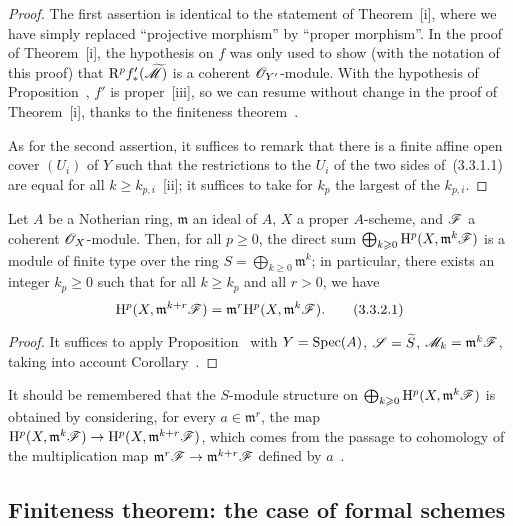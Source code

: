\begin{proof}
\label{proof-3.3.3.1}
The first assertion is identical to the statement of Theorem~[i], where we have simply replaced ``projective morphism'' by ``proper morphism''.
In the proof of Theorem~[i], the hypothesis on $f$ was only used to show (with the notation of this proof) that $\mathrm{R}^p f_*'(\widetilde{\mathscr{M}})$ is a coherent $\mathscr{O}_{Y'}$-module.
With the hypothesis of Proposition~, $f'$ is proper~[iii], so we can resume without change in the proof of Theorem~[i], thanks to the finiteness theorem~.

As for the second assertion, it suffices to remark that there is a finite affine open cover $(U_i)$ of $Y$ such that the restrictions to the $U_i$ of the two sides of~(3.3.1.1) are equal for all $k\geq k_{p,i}$~[ii]; it suffices to take for $k_p$ the largest of the $k_{p,i}$.
\end{proof}

\begin{corollary}[3.3.2]
\label{3.3.3.2}
Let $A$ be a Notherian ring, $\mathfrak{m}$ an ideal of $A$, $X$ a proper $A$-scheme, and $\mathscr{F}$ a coherent $\mathscr{O}_X$-module.
Then, for all $p\geq 0$, the direct sum $\bigoplus_{k\geqslant 0}\mathrm{H}^p(X,\mathfrak{m}^k\mathscr{F})$ is a module of finite type over the ring $S=\bigoplus_{k\geq 0}\mathfrak{m}^k$; in particular, there exists an integer $k_p\geq 0$ such that for all $k\geq k_p$ and all $r>0$, we have
\[
\label{3.3.3.2.1}
  \mathrm{H}^p(X,\mathfrak{m}^{k+r}\mathscr{F})=\mathfrak{m}^r\mathrm{H}^p(X,\mathfrak{m}^k\mathscr{F}).
  \tag{3.3.2.1}
\]
\end{corollary}

\begin{proof}
\label{proof-3.3.3.2}
It suffices to apply Proposition~ with $Y=\operatorname{Spec}(A)$, $\mathscr{S}=\widetilde{S}$, $\mathscr{M}_k=\mathfrak{m}^k\mathscr{F}$, taking into account Corollary~.
\end{proof}

It should be remembered that the $S$-module structure on $\bigoplus_{k\geqslant 0}\mathrm{H}^p(X,\mathfrak{m}^k\mathscr{F})$ is obtained by considering, for every $a\in\mathfrak{m}^r$, the map $\HH^p(X,\mathfrak{m}^k\sh{F})\to\HH^p(X,\mathfrak{m}^{k+r}\sh{F})$, which comes from the passage to cohomology of the multiplication map $\mathfrak{m}^r\sh{F}\to\mathfrak{m}^{k+r}\sh{F}$ defined by $a$~.

\subsection{Finiteness theorem: the case of formal schemes}
\label{subsection:3.3.4}

